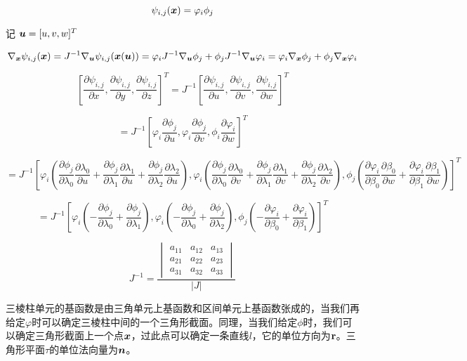 \documentclass{article}
\begin{document}
$$
\psi_{i, j}(\boldsymbol x) = \varphi_i\phi_j
$$

记 $\boldsymbol u = [u, v, w]^T$

$$
\nabla_{\boldsymbol x} \psi_{i, j}(\boldsymbol x) = J^{-1} 
\nabla_{\boldsymbol u} \psi_{i, j}(\boldsymbol x(\boldsymbol u)) 
= \varphi_i J^{-1}\nabla_{\boldsymbol u}\phi_j + \phi_j J^{-1} \nabla_{\boldsymbol u}\varphi_i
= \varphi_i \nabla_{\boldsymbol x}\phi_j + \phi_j\nabla_{\boldsymbol x}\varphi_i
$$

$$
\left[\frac{\partial \psi_{i,j}}{\partial x},\frac{\partial \psi_{i,j}}{\partial y},\frac{\partial \psi_{i,j}}{\partial z}\right]^T=J^{-1}\left[\frac{\partial \psi_{i,j}}{\partial u},\frac{\partial \psi_{i,j}}{\partial v},\frac{\partial \psi_{i,j}}{\partial w}\right]^T
$$

$$
=J^{-1}\left[\varphi_i \frac{\partial \phi_j}{\partial u},\varphi_i \frac{\partial \phi_j}{\partial v},\phi_i \frac{\partial \varphi_i}{\partial w}\right]^T
$$

$$
=J^{-1}\left[\varphi_i(\frac{\partial \phi_j}{\partial \lambda_0}\frac{\partial \lambda_0}{\partial u}+\frac{\partial \phi_j}{\partial \lambda_1} \frac{\partial \lambda_1}{\partial u}+\frac{\partial \phi_j}{\partial \lambda_2} \frac{\partial \lambda_2}{\partial u}),
\varphi_i(\frac{\partial \phi_j}{\partial \lambda_0}\frac{\partial \lambda_0}{\partial v}+\frac{\partial \phi_j}{\partial \lambda_1} \frac{\partial \lambda_1}{\partial v}+\frac{\partial \phi_j}{\partial \lambda_2} \frac{\partial \lambda_2}{\partial v}),
\phi_j(\frac{\partial \varphi_i}{\partial \beta_0} \frac{\partial \beta_0}{\partial w}+\frac{\partial \varphi_i}{\partial \beta_1} \frac{\partial \beta_1}{\partial w})\right]^T
$$

$$
=J^{-1}\left[\varphi_i(-\frac{\partial \phi_j}{\partial \lambda_0}+\frac{\partial \phi_j}{\partial \lambda_1}),\varphi_i(-\frac{\partial \phi_j}{\partial \lambda_0}+\frac{\partial \phi_j}{\partial \lambda_2}),\phi_j(-\frac{\partial \varphi_i}{\partial \beta_0}+\frac{\partial \varphi_i}{\partial \beta_1})\right]^T
$$

$$J^{-1}=\frac{\begin{vmatrix}
a_{11} & a_{12} & a_{13}\\
a_{21} & a_{22} & a_{23}\\
a_{31} & a_{32} & a_{33}
\end{vmatrix}
}{|J|}$$

三棱柱单元的基函数是由三角单元上基函数和区间单元上基函数张成的，当我们再给定$\varphi$时可以确定三棱柱中间的一个三角形截面。同理，当我们给定$\phi$时，我们可以确定三角形截面上一个点$\boldsymbol x$，过此点可以确定一条直线$l$，它的单位方向为$\bf r$。三角形平面$\tau$的单位法向量为$\boldsymbol n$。
\end{document}
